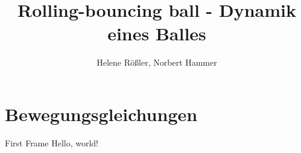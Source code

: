 \documentclass{beamer}
\title{Rolling-bouncing ball - Dynamik eines Balles}
\author{Helene Rößler, Norbert Hammer}
\date{}
\begin{document}
\maketitle

\section{Bewegungsgleichungen}

\begin{frame}{First Frame}
Hello, world!
\end{frame}
\end{document}
